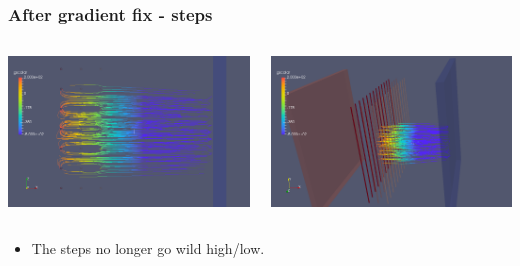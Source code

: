 \documentclass[xcolor=dvipsnames]{beamer}
\begin{document}
\begin{frame}
  \frametitle{After gradient fix - steps}
  \begin{columns}
    \begin{column}{0.5\textwidth}
      \includegraphics[width=\textwidth]{twodee-fine-steps-plan-gradfixed.png}      
    \end{column}
    \begin{column}{0.5\textwidth}
      \includegraphics[width=\textwidth]{twodee-fine-steps-side-gradfixed.png}      
    \end{column}
  \end{columns}
  \footnotesize
  \begin{itemize}
  \item The steps no longer go wild high/low.
  \end{itemize}
\end{frame}
\end{document}
